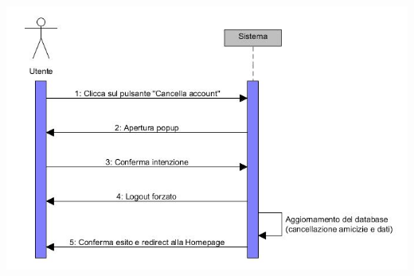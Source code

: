 \documentclass[a4paper,12pt]{article}
\begin{document}
\begin{center}
\vspace*{\fill}
\includegraphics[scale=0.75]{sDiagrams/cancellazioneAccount.jpg} \\
\end{center}
\clearpage
\end{document}
